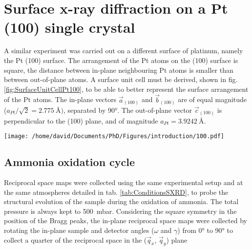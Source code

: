 \newpage
\section{Surface x-ray diffraction on a Pt (100) single crystal} \label{sec:SXRD100}


A similar experiment was carried out on a different surface of platinum, namely the Pt (100) surface.
The arrangement of the Pt atoms on the (100) surface is square, the distance between in-plane neighbouring Pt atoms is smaller than between out-of-plane atoms.
A surface unit cell must be derived, shown in fig. \ref{fig:SurfaceUnitCellPt100}, to be able to better represent the surface arrangement of the Pt atoms.
The in-plane vectors $\vec{a}_{(100)}$ and $\vec{b}_{(100)}$ are of equal magnitude ($a_{Pt} / \sqrt{2} = \qty{2.775}{\angstrom})$, separated by \ang{90}.
The out-of-plane vector $\vec{c}_{(100)}$ is perpendicular to the (100) plane, and of magnitude $a_{Pt} = \qty{3.9242}{\angstrom}$.

\begin{SCfigure}
    \centering
    \texttt{[image: /home/david/Documents/PhD/Figures/introduction/100.pdf]}
    \caption{
        Face-entered cubic unit cell of Pt with $(100)$ crystallographic plane drawn in green.
        $\vec{a}_{(100)}$, $\vec{b}_{(100)}$ and $\vec{c}_{(100)}$ are the $(100)$ surface unit cell vectors.
    }
    \label{fig:SurfaceUnitCellPt100}
\end{SCfigure}

\subsection{Ammonia oxidation cycle}

Reciprocal space maps were collected using the same experimental setup and at the same atmospheres detailed in tab. \ref{tab:ConditionsSXRD}, to probe the structural evolution of the sample during the oxidation of ammonia.
The total pressure is always kept to \qty{500}{\milli\bar}.
Considering the square symmetry in the position of the Bragg peaks, the in-plane reciprocal space maps were collected by rotating the in-plane sample and detector angles ($\omega$ and $\gamma$) from \ang{0} to \ang{90} to collect a quarter of the reciprocal space in the ($\vec{q}_x$, $\vec{q}_y$) plane

